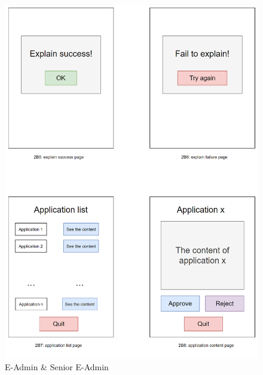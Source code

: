 \documentclass[a4paper,12pt]{article}
\begin{document}
\begin{figure}[H]
    \begin{center}
        \includegraphics[width=\textwidth]{picture/1231238989.png}
        \caption{E-Admin \& Senior E-Admin}
        \label{fig:access-thesis}
    \end{center}
\end{figure}
\end{document}
